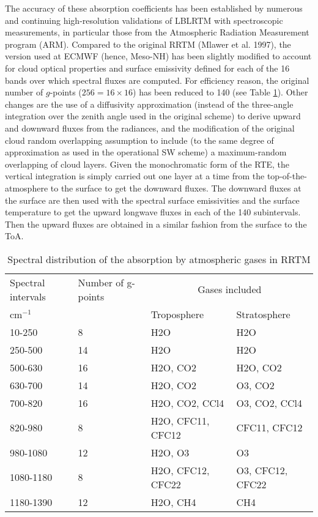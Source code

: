 The accuracy of these absorption coefficients has been established by numerous and continuing high-resolution validations of LBLRTM with spectroscopic measurements, in particular those from the Atmospheric Radiation Measurement program (ARM). Compared to the original RRTM (Mlawer et al. 1997), the version used at ECMWF (hence, Meso-NH) has been slightly modified to account for cloud optical properties and surface emissivity defined for each of the 16 bands over which spectral fluxes are computed. For efficiency reason, the original number of $g$-points ($256 = 16 \times 16$) has been reduced to 140 (see Table \ref{tabrrtm}). Other changes are the use of a diffusivity approximation (instead of the three-angle integration over the zenith angle used in the original scheme) to derive upward and downward fluxes from the radiances, and the modification of the original cloud random overlapping assumption to include (to the same degree of approximation as used in the operational SW scheme) a maximum-random overlapping of cloud layers. Given the monochromatic form of the RTE, the vertical integration is simply carried out one layer at a time from the top-of-the-atmosphere to the surface to get the downward fluxes. The downward fluxes at the surface are then used with the spectral surface emissivities and the surface temperature to get the upward longwave fluxes in each of the 140 subintervals. Then the upward fluxes are obtained in a similar fashion from the surface to the ToA.


\begin{table}[!ht]
\caption{Spectral distribution of the absorption by atmospheric gases in RRTM}
\begin{center}
\begin{tabular}{|l|l|l|l|}
\hline
Spectral intervals & Number of g-points & \multicolumn{2}{c|}{Gases included}\\
cm$^{-1}$ & & Troposphere & Stratosphere \\ 
\hline
10-250   &  8 & H2O & H2O \\ 
250-500  & 14 & H2O & H2O \\ 
500-630  & 16 & H2O, CO2 & H2O, CO2 \\ 
630-700  & 14 & H2O, CO2 & O3, CO2 \\ 
700-820  & 16 & H2O, CO2, CCl4 & O3, CO2, CCl4 \\ 
820-980  &  8 & H2O, CFC11, CFC12 & CFC11, CFC12 \\ 
980-1080 &  12 & H2O, O3 & O3 \\ 
1080-1180 &  8 & H2O, CFC12, CFC22 & O3, CFC12, CFC22 \\ 
1180-1390 & 12 & H2O, CH4 & CH4 \\
\hline
\end{tabular}
\label{tabrrtm}
\end{center}
\end{table}


